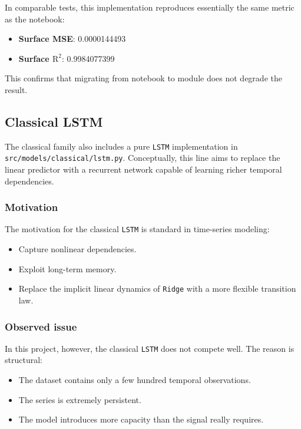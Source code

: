 \documentclass[11pt,a4paper]{article}
\newcommand{\Rtwo}{\ensuremath{\mathrm{R}^2}}
\begin{document}
In comparable tests, this implementation reproduces essentially the same metric as the notebook:

\begin{itemize}
    \item \textbf{Surface MSE}: 0.0000144493
    \item \textbf{Surface $\Rtwo$}: 0.9984077399
\end{itemize}

This confirms that migrating from notebook to module does not degrade the result.

\subsection{Classical LSTM}

The classical family also includes a pure \texttt{LSTM} implementation in \texttt{src/models/classical/lstm.py}. Conceptually, this line aims to replace the linear predictor with a recurrent network capable of learning richer temporal dependencies.

\subsubsection{Motivation}
The motivation for the classical \texttt{LSTM} is standard in time-series modeling:

\begin{itemize}
    \item Capture nonlinear dependencies.
    \item Exploit long-term memory.
    \item Replace the implicit linear dynamics of \texttt{Ridge} with a more flexible transition law.
\end{itemize}

\subsubsection{Observed issue}
In this project, however, the classical \texttt{LSTM} does not compete well. The reason is structural:

\begin{itemize}
    \item The dataset contains only a few hundred temporal observations.
    \item The series is extremely persistent.
    \item The model introduces more capacity than the signal really requires.
\end{itemize}
\end{document}
